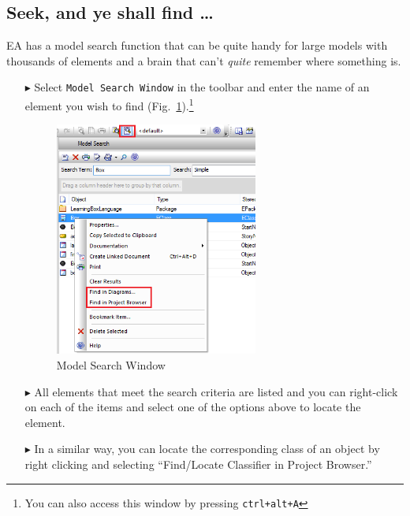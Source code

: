 \newpage

\hypertarget{subsec:seekAndFind}{}

\subsection{Seek, and ye shall find \ldots}

EA has a model search function that can be quite handy for large models with thousands of elements and a brain that can't \emph{quite} remember where something
is.

\begin{enumerate}

\item[$\blacktriangleright$]Select \texttt{Model Search Window} in the toolbar and enter the name of an element you wish to find
(Fig.~\ref{fig_search01}).\footnote{You can also access this window by pressing \texttt{ctrl+alt+A}} 

\vspace{0.5cm}

\begin{figure}[htbp]
\begin{center}
  \includegraphics[width=0.63\textwidth]{search1}
  \caption{Model Search Window}  
  \label{fig_search01}
\end{center}
\end{figure}

\item[$\blacktriangleright$] All elements that meet the search criteria are listed and you can right-click on each of the items and select one of the options
above to locate the element.

\item[$\blacktriangleright$] In a similar way, you can locate the corresponding class of an object by right clicking and selecting ``Find/Locate Classifier in
Project Browser.''

\vfill

\end{enumerate}
